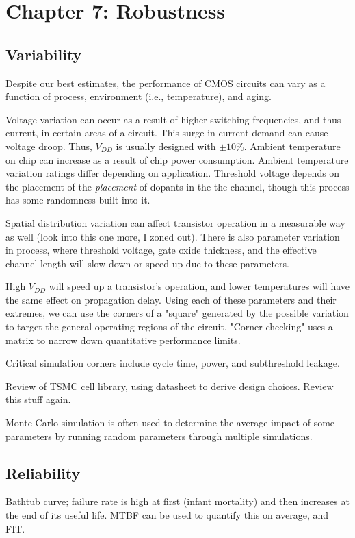 \documentclass{article}
\begin{document}
\setcounter{section}{5}
\section{Chapter 7: Robustness} 
\setcounter{subsection}{1}
\subsection{Variability}
Despite our best estimates, the performance of CMOS circuits can vary as a function of process, environment (i.e., temperature), and aging. 

Voltage variation can occur as a result of higher switching frequencies, and thus current, in certain areas of a circuit. This surge in current demand can cause voltage droop. Thus, \(V_{DD}\) is usually designed with \(\pm 10\%\). Ambient temperature on chip can increase as a result of chip power consumption. Ambient temperature variation ratings differ depending on application. Threshold voltage depends on the placement of the \textit{placement} of dopants in the the channel, though this process has some randomness built into it. 

Spatial distribution variation can affect transistor operation in a measurable way as well (look into this one more, I zoned out). There is also parameter variation in process, where threshold voltage, gate oxide thickness, and the effective channel length will slow down or speed up due to these parameters.

High \(V_{DD}\) will speed up a transistor's operation, and lower temperatures will have the same effect on propagation delay. Using each of these parameters and their extremes, we can use the corners of a "square" generated by the possible variation to target the general operating regions of the circuit. "Corner checking" uses a matrix to narrow down quantitative performance limits.

Critical simulation corners include cycle time, power, and subthreshold leakage.

Review of TSMC cell library, using datasheet to derive design choices. Review this stuff again.

Monte Carlo simulation is often used to determine the average impact of some parameters by running random parameters through multiple simulations.

\subsection{Reliability}
Bathtub curve; failure rate is high at first (infant mortality) and then increases at the end of its useful life. MTBF can be used to quantify this on average, and FIT.
\end{document}
